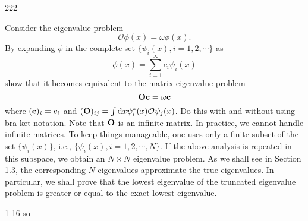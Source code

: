 \documentclass[a4paper]{book}
\newcommand*{\dif}{\mathop{}\!\mathrm{d}}
\newcommand{\Op}{{\bf O}}
\begin{document}
	\begin{solution}
		222
	\end{solution}

	\begin{exercise}
	Consider the eigenvalue problem
	\begin{equation}
		\mathcal{O} \phi(x) = \omega \phi(x).
	\end{equation}
	By expanding $\phi$ in the complete set $\{\psi_i(x),i=1,2,\cdots\}$ as
	\begin{equation*}
		\phi(x) = \sum_{i=1}^\infty c_i \psi_i(x)
	\end{equation*}
	show that it becomes equivalent to the matrix eigenvalue problem
	\begin{equation*}
		\Op {\bf c} = \omega {\bf c}
	\end{equation*}
	where $({\bf c})_i=c_i$ and $({\bf O})_{ij} = \int \dif x \psi^*_i(x)\mathcal{O}\psi_j(x)$. Do this with and without using bra-ket notation. Note that $\Op$ is an infinite matrix. In practice, we cannot handle infinite matrices. To keep things manageable, one uses only a finite subset of the set $\{\psi_i(x)\}$, i.e., $\{\psi_i(x),i=1,2,\cdots, N\}$. If the above analysis is repeated in this subspace, we obtain an $N \times N$ eigenvalue problem. As we shall see in Section 1.3, the corresponding $N$ eigenvalues approximate the true eigenvalues. In particular, we shall prove that the lowest eigenvalue of the truncated eigenvalue problem is greater or equal to the exact lowest eigenvalue.
	\end{exercise}
	
	\begin{solution}
		1-16 so
	\end{solution}
	
\end{document}
